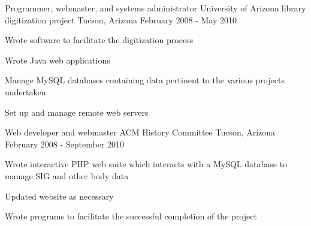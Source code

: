 \begin{cventries}
  \cventry
    {Programmer, webmaster, and systems administrator}
    {University of Arizona library digitization project}
    {Tucson, Arizona}
    {February 2008 - May 2010}
    {
      \begin{cvitems} %
        \item {Wrote software to facilitate the digitization process}
        \item {Wrote Java web applications}
        \item {Manage MySQL databases containing data pertinent to the various projects undertaken}
        \item {Set up and manage remote web servers}
      \end{cvitems}
    }

  \cventry
    {Web developer and webmaster}
    {ACM History Committee}
    {Tucson, Arizona}
    {February 2008 - September 2010}
    {
      \begin{cvitems} %
        \item {Wrote interactive PHP web suite which interacts with a MySQL database to manage SIG and other body data}
        \item {Updated website as necessary}
        \item {Wrote programs to facilitate the successful completion of the project}
      \end{cvitems}
    }

\end{cventries}
